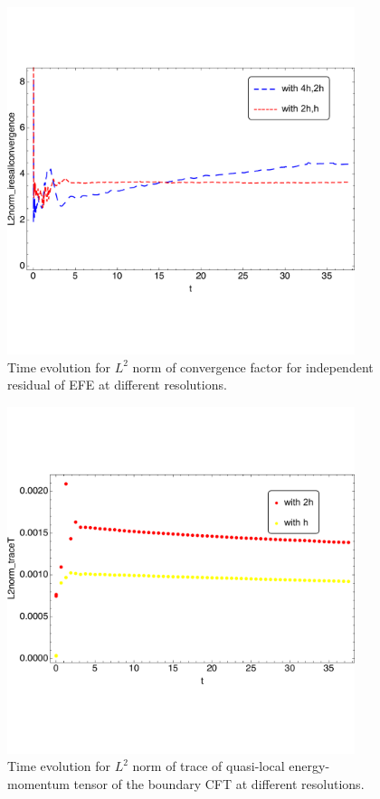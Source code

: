 \documentclass[12pt]{iopart}
\begin{document}
\begin{figure}[h]
        \centering
        \includegraphics[width=4.0in,clip=true]{plots/timeseries/L2norm_iresallconvergence/fullplotiresallconvergenceL1L2L3res-cropped.pdf}
\parbox{5.0in}{\caption{Time evolution for $L^2$ norm of convergence factor for independent residual of EFE at different resolutions.
        }\label{fig:L2norm_iresallconvergence-crop}}
\end{figure}

\begin{figure}[h]
        \centering
        \includegraphics[width=4.0in,clip=true]{plots/timeseries/L2norm_quasiset_trace/fullplotL2normtraceL2L3res-cropped.pdf}
\parbox{5.0in}{\caption{Time evolution for $L^2$ norm of trace of quasi-local energy-momentum tensor of the boundary CFT at different resolutions.
        }\label{fig:L2norm_quasisettrace-crop}}
\end{figure}
\end{document}
